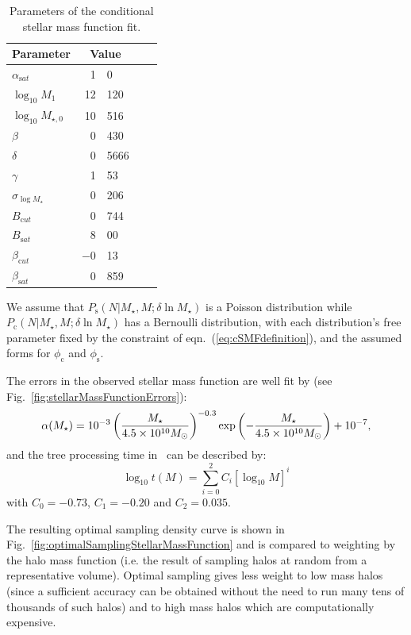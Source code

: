 \begin{table}
\begin{center}
\caption{Parameters of the conditional stellar mass function fit.}
\label{tb:z0SMFFitParameters}
\begin{tabular}{lr@{.}lr@{.}l}
\hline
{\normalfont \bfseries Parameter} & \multicolumn{2}{c}{\normalfont \bfseries Value} \\
\hline
$\alpha_{\mathrm sat}$& 1&0 \\
$\log_{10} M_1$& 12&120 \\
$\log_{10} M_{\star,0}$& 10&516 \\
$\beta$& 0&430 \\
$\delta$& 0&5666 \\
$\gamma$& 1&53 \\
$\sigma_{\log M_\star}$& 0&206 \\
$B_{\mathrm cut}$& 0&744 \\
$B_{\mathrm sat}$& 8&00 \\
$\beta_{\mathrm cut}$& $-$0&13 \\
$\beta_{\mathrm sat}$& 0&859 \\
\hline
\end{tabular}
\end{center}
\end{table}

We assume that $P_{\mathrm s}(N|M_\star,M;\delta \ln M_\star)$ is a Poisson distribution while $P_{\mathrm c}(N|M_\star,M;\delta \ln M_\star)$ has a Bernoulli distribution, with each distribution's free parameter fixed by the constraint of eqn.~(\ref{eq:cSMFdefinition}), and the assumed forms for $\phi_{\mathrm c}$ and $\phi_{\mathrm s}$.

The errors in the \cite{li_distribution_2009} observed stellar mass function are well fit by (see Fig.~\ref{fig:stellarMassFunctionErrors}):
\begin{equation}
 \alpha(M_\star) = 10^{-3} \left({M_\star\over 4.5\times 10^{10}M_\odot}\right)^{-0.3} \exp\left(-{M_\star\over 4.5\times 10^{10}M_\odot}\right) + 10^{-7},
 \label{eq:stellarMassFunctionErrorsFit}
\end{equation}
and the tree processing time in \glc\ can be described by:
\begin{equation}
 \log_{10} t(M) = \sum_{i=0}^2 C_i [ \log_{10} M ]^i
\end{equation}
with $C_0=-0.73$, $C_1=-0.20$ and $C_2=0.035$.

The resulting optimal sampling density curve is shown in Fig.~\ref{fig:optimalSamplingStellarMassFunction} and is compared to weighting by the halo mass function (i.e. the result of sampling halos at random from a representative volume). Optimal sampling gives less weight to low mass halos (since a sufficient accuracy can be obtained without the need to run many tens of thousands of such halos) and to high mass halos which are computationally expensive. 

